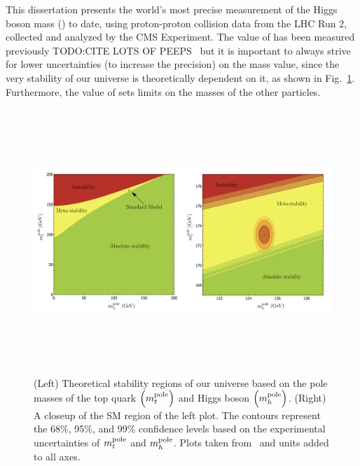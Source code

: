 This dissertation presents the world's most precise measurement of the Higgs boson mass (\mH) to date, using proton-proton collision data from the LHC Run 2, collected and analyzed by the CMS Experiment.
The value of \mh has been measured previously TODO:CITE LOTS OF PEEPS~\cite{hig16041} but it is important to always strive for lower uncertainties (\ie to increase the precision) on the mass value, since the very stability of our universe is theoretically dependent on it, as shown in Fig.~\ref{fig:universe_stability}.
Furthermore, the value of \mh sets limits on the masses of the other particles.
\begin{figure}[hbtp]
    \centering
    \includegraphics[width=15cm,height=10cm,keepaspectratio]{figures/intro/mtop_vs_mH_universestability.png}
        \caption{
        (Left) Theoretical stability regions of our universe based on the pole masses of the top quark $\left( m_{t}^\text{pole} \right)$ and Higgs boson $\left( m_{h}^\text{pole} \right)$.
        (Right) A closeup of the SM region of the left plot.
        The contours represent the 68\%, 95\%, and 99\% confidence levels based on the experimental uncertainties of $m_{t}^\text{pole}$ and $m_{h}^\text{pole}$.
        Plots taken from~\cite{univ_stab} and units added to all axes.
        }
        \label{fig:universe_stability}
\end{figure}

